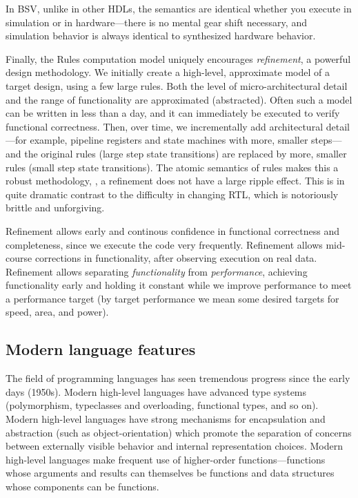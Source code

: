 In BSV, unlike in other HDLs, the semantics are identical whether you
execute in simulation or in hardware---there is no mental gear shift
necessary, and simulation behavior is always identical to synthesized
hardware behavior.

Finally, the Rules computation model uniquely encourages
\emph{refinement}, a powerful design methodology.  We initially create
a high-level, approximate model of a target design, using a few large
rules.  Both the level of micro-architectural detail and the range of
functionality are approximated (abstracted).  Often such a model can
be written in less than a day, and it can immediately be executed to
verify functional correctness.  Then, over time, we incrementally add
architectural detail---for example, pipeline registers and state
machines with more, smaller steps---and the original rules (large step
state transitions) are replaced by more, smaller rules (small step
state transitions).  The atomic semantics of rules makes this a robust
methodology, {\ie}, a refinement does not have a large ripple effect.
This is in quite dramatic contrast to the difficulty in changing RTL,
which is notoriously brittle and unforgiving.

Refinement allows early and continous confidence in functional
correctness and completeness, since we execute the code very
frequently.  Refinement allows mid-course corrections in
functionality, after observing execution on real data.  Refinement
allows separating \emph{functionality} from \emph{performance},
achieving functionality early and holding it constant while we improve
performance to meet a performance target (by target performance we
mean some desired targets for speed, area, and power).


\subsection{Modern language features}

The field of programming languages has seen tremendous progress since
the early days (1950s).  Modern high-level languages have advanced
type systems (polymorphism, typeclasses and overloading, functional
types, and so on).  Modern high-level languages have strong mechanisms
for encapsulation and abstraction (such as object-orientation) which
promote the separation of concerns between externally visible behavior
and internal representation choices.  Modern high-level languages make
frequent use of higher-order functions---functions whose arguments and
results can themselves be functions and data structures whose
components can be functions.

